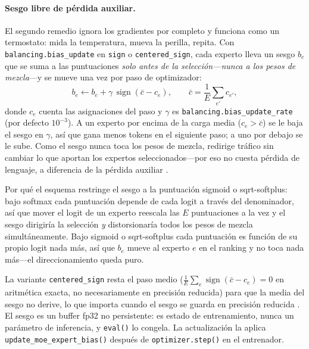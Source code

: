 \paragraph{Sesgo libre de pérdida auxiliar.}
El segundo remedio ignora los gradientes por completo y funciona como un
termostato: mida la temperatura, mueva la perilla, repita. Con
\texttt{balancing.bias\_update} en \texttt{sign} o \texttt{centered\_sign},
cada experto lleva un sesgo $b_e$ que se suma a las puntuaciones \emph{solo
antes de la selección---nunca a los pesos de mezcla}---y se mueve una vez por
paso de optimizador:
\begin{equation}
  b_e \leftarrow b_e + \gamma\,\operatorname{sign}\!\left(\bar c - c_e\right),
  \qquad
  \bar c = \frac{1}{E}\sum_{e'} c_{e'},
  \label{eq:bias-es}
\end{equation}
donde $c_e$ cuenta las asignaciones del paso y $\gamma$ es
\texttt{balancing.bias\_update\_rate} (por defecto $10^{-3}$). A un experto por
encima de la carga media ($c_e > \bar c$) se le baja el sesgo en $\gamma$, así
que gana menos tokens en el siguiente paso; a uno por debajo se le sube. Como
el sesgo nunca toca los pesos de mezcla, redirige tráfico sin cambiar lo que
aportan los expertos seleccionados---por eso no cuesta pérdida de lenguaje, a
diferencia de la pérdida auxiliar \citep{wang2024auxfree}.

Por qué el esquema restringe el sesgo a la puntuación sigmoid o sqrt-softplus:
bajo softmax cada puntuación depende de cada logit a través del denominador,
así que mover el logit de un experto reescala las $E$ puntuaciones a la vez y
el sesgo dirigiría la selección \emph{y} distorsionaría todos los pesos de
mezcla simultáneamente. Bajo sigmoid o sqrt-softplus cada puntuación es
función de su propio logit nada más, así que $b_e$ mueve al experto $e$ en el
ranking y no toca nada más---el direccionamiento queda puro.

La variante \texttt{centered\_sign} resta el paso medio
($\tfrac{1}{E}\sum_{e}\operatorname{sign}(\bar c - c_e) = 0$ en aritmética
exacta, no necesariamente en precisión reducida) para que la media del sesgo no
derive, lo que importa cuando el sesgo se guarda en precisión reducida
\citep{wang2024auxfree}. El sesgo es un buffer fp32 no persistente: es estado
de entrenamiento, nunca un parámetro de inferencia, y \texttt{eval()} lo
congela. La actualización la aplica \texttt{update\_moe\_expert\_bias()}
después de \texttt{optimizer.step()} en el entrenador.

